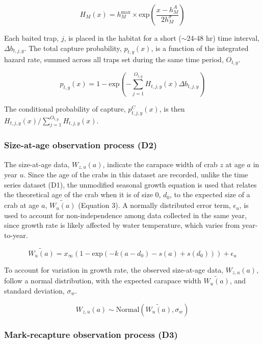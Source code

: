 \documentclass{article}
\begin{document}
\begin{equation}
H_M(x) = h^{\text{max}}_M \times \text{exp}(\frac{x-h^{A}_M}{2 h^{\sigma}_M})
\end{equation}

Each baited trap, $j$, is placed in the habitat for a short ($\sim$24-48 hr) time interval, $\Delta b_{t,j,y}$. The total capture probability, $p_{t,y}(x)$, is a function of the integrated hazard rate, summed across all traps set during the same time period, $O_{t,y}$.

\begin{equation}
p_{t,y}(x) = 1-\text{exp}\left(-\sum_{j=1}^{O_{t,y}} H_{t,j,y}(x)\Delta b_{t,j,y}\right)
\end{equation}

The conditional probability of capture, $p^C_{t,j,y}(x)$, is then $H_{t,j,y}(x)/\sum_{j=1}^{O_{t,y}}H_{t,j,y}(x)$.

\subsubsection*{Size-at-age observation process (D2)}

The size-at-age data, $W_{z,u}(a)$, indicate the carapace width of crab $z$ at age $a$ in year $u$. Since the age of the crabs in this dataset are recorded, unlike the time series dataset (D1), the unmodified seasonal growth equation is used that relates the theoretical age of the crab when it is of size 0, $d_0$, to the expected size of a crab at age $a$, $\widetilde{W_u(a)}$ (Equation 3). A normally distributed error term, $\epsilon_u$, is used to account for non-independence among data collected in the same year, since growth rate is likely affected by water temperature, which varies from year-to-year.

\begin{equation}
\widetilde{W_u(a)} = x_{\infty}(1-\text{exp}(-k(a-d_0) - s(a) + s(d_0))) + \epsilon_u
\end{equation}

To account for variation in growth rate, the observed size-at-age data, $W_{z,u}(a)$, follow a normal distribution, with the expected carapace width $\widetilde{W_u(a)}$, and standard deviation, $\sigma_{w}$.

\begin{equation}
W_{z,u}(a) \sim \text{Normal}(\widetilde{W_u(a)}, \sigma_{w})
\end{equation}

\subsubsection*{Mark-recapture observation process (D3)}
\end{document}
